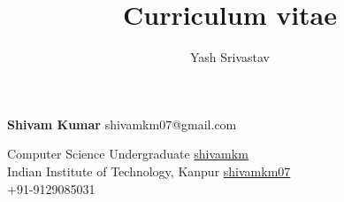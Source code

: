 \documentclass[9pt]{extarticle}
\title{Curriculum vitae}
\author{Yash Srivastav}
\begin{document}

\begingroup
{}



\begin{minipage}[t]{\textwidth}
{\Huge\textbf{\sc Shivam Kumar}}
\hfill
shivamkm07@gmail.com \faEnvelope


Computer Science Undergraduate
\hfill
\href{https://github.com/shivamkm/}{shivamkm \faGithub}
\\
Indian Institute of Technology, Kanpur
\hfill
\href{https://www.linkedin.com/in/shivamkm07/}{shivamkm07 \faLinkedin}\\
\hfill +91-9129085031 \faMobile
\end{minipage}

\begin{minipage}[t]{0.49\textwidth}
  \vspace{3mm}
  
  
  
  
  
     
\end{minipage}
\hfill
\begin{minipage}[t]{0.49\textwidth}
  \vspace{3mm}
  
  
\end{minipage}

\endgroup
\end{document}
